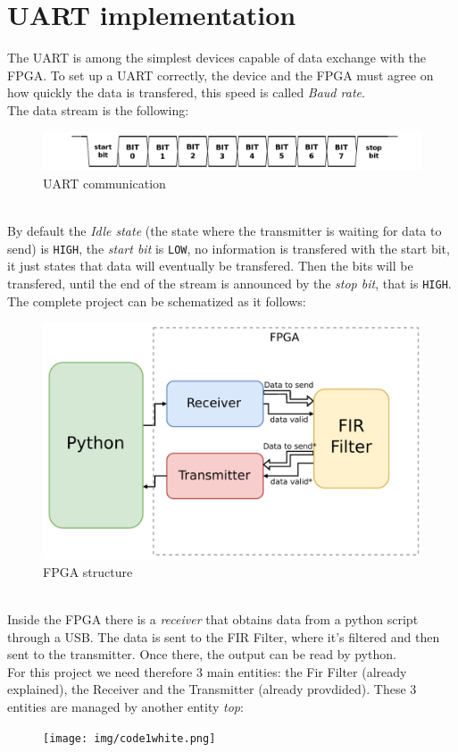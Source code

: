 \documentclass[11pt,a4paper,twocolumn]{IEEEtran}
\begin{document}
	\section{UART implementation}
	The UART is among the simplest devices capable of data exchange with the FPGA.
	To set up a UART correctly, the device and the FPGA must agree on how quickly the data is transfered, this speed is called \emph{Baud rate}.\\
	The data stream is the following:
	\begin{figure}[h]
		\centering
		\includegraphics[width=1\linewidth]{img/UART_timing_diagram}
		\caption{UART communication}
	\end{figure}\\
	By default the \emph{Idle state} (the state where the transmitter is waiting for data to send) is \texttt{HIGH}, the \emph{start bit} is \texttt{LOW}, no information is transfered with the start bit, it just states that data will eventually be transfered. Then the bits will be transfered, until the end of the stream is announced by the \emph{stop bit}, that is \texttt{HIGH}.\newpage
	The complete project can be schematized as it follows:
	\begin{figure}[h]
		\centering
		\includegraphics[width=1\linewidth]{img/projectcompletepdf}
		\caption{FPGA structure}
		\label{fig:fpgastruct}
	\end{figure}\\
	Inside the FPGA there is a \emph{receiver} that obtains data from a python script through a USB. The data is sent to the FIR Filter, where it's filtered and then sent to the transmitter. Once there, the output can be read by python.\\
	For this project we need therefore 3 main entities: the Fir Filter (already explained), the Receiver and the Transmitter (already provdided). These 3 entities are managed by another entity \emph{top}:
	\begin{figure}[h]
		\centering
		\vspace*{-.4cm}
		\hspace*{-.8cm}\texttt{[image: img/code1white.png]}
	\end{figure}
	\newpage
\end{document}
